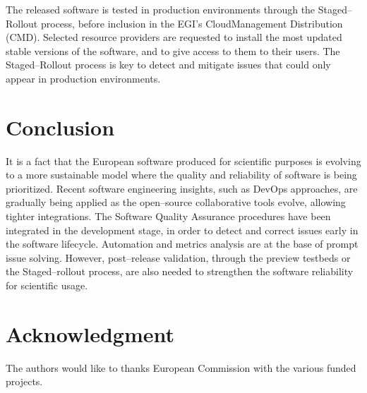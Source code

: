 \documentclass[journal]{IEEEtran}
\begin{document}
The released software is tested in production environments through the
Staged--Rollout process, before inclusion in the EGI's CloudManagement Distribution (CMD). 
Selected resource providers are requested to install
the most updated stable versions of the software, and to give access to them to their users. The
Staged--Rollout process is key to detect and mitigate issues that could only
appear in production environments.

\section{Conclusion}
\label{sec:con}

It is a fact that the European software produced for scientific purposes is
evolving to a more sustainable model where the quality and reliability of
software is being prioritized. Recent software engineering insights, such as
DevOps approaches, are gradually being applied as the open--source collaborative tools
evolve, allowing tighter integrations. The Software Quality
Assurance procedures have been integrated in the development stage, in order to
detect and correct issues early in the software lifecycle. Automation and
metrics analysis are at the base of prompt issue solving. However, post--release
validation, through the preview testbeds or the Staged--rollout process, are
also needed to strengthen the software reliability for scientific usage.

\section*{Acknowledgment}

The authors would like to thanks European Commission with the various funded
projects.
\end{document}
